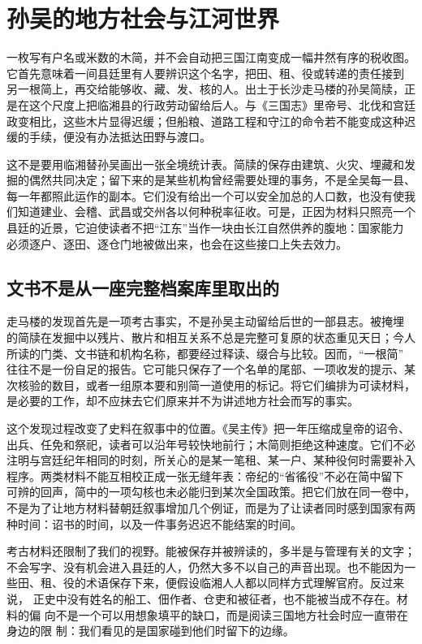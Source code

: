 \section{孙吴的地方社会与江河世界}
\label{reader:wu-river-society:start}

一枚写有户名或米数的木简，并不会自动把三国江南变成一幅井然有序的税收图。
它首先意味着一间县廷里有人要辨识这个名字，把田、租、役或转递的责任接到
另一根简上，再交给能够收、藏、发、核的人。出土于长沙走马楼的孙吴简牍，正
是在这个尺度上把临湘县的行政劳动留给后人。与《三国志》里帝号、北伐和宫廷
政变相比，这些木片显得迟缓；但船粮、道路工程和守江的命令若不能变成这种迟
缓的手续，便没有办法抵达田野与渡口。

这不是要用临湘替孙吴画出一张全境统计表。简牍的保存由建筑、火灾、埋藏和发
掘的偶然共同决定；留下来的是某些机构曾经需要处理的事务，不是全吴每一县、
每一年都照此运作的副本。它们没有给出一个可以安全加总的人口数，也没有使我
们知道建业、会稽、武昌或交州各以何种税率征收。可是，正因为材料只照亮一个
县廷的近景，它迫使读者不把“江东”当作一块由长江自然供养的腹地：国家能力
必须逐户、逐田、逐仓门地被做出来，也会在这些接口上失去效力。

\subsection{文书不是从一座完整档案库里取出的}

走马楼的发现首先是一项考古事实，不是孙吴主动留给后世的一部县志。被掩埋
的简牍在发掘中以残片、散片和相互关系不总是完整可复原的状态重见天日；今人
所读的门类、文书链和机构名称，都要经过释读、缀合与比较。因而，“一根简”
往往不是一份自足的报告。它可能只保存了一个名单的尾部、一项收发的提示、某
次核验的数目，或者一组原本要和别简一道使用的标记。将它们编排为可读材料，
是必要的工作，却不应抹去它们原来并不为讲述地方社会而写的事实。

这个发现过程改变了史料在叙事中的位置。《吴主传》把一年压缩成皇帝的诏令、
出兵、任免和祭祀，读者可以沿年号较快地前行；木简则拒绝这种速度。它们不必
注明与宫廷纪年相同的时刻，所关心的是某一笔租、某一户、某种役何时需要补入
程序。两类材料不能互相校正成一张无缝年表：帝纪的“省徭役”不必在简中留下
可辨的回声，简中的一项勾核也未必能归到某次全国政策。把它们放在同一卷中，
不是为了让地方材料替朝廷叙事增加几个例证，而是为了让读者同时感到国家有两
种时间：诏书的时间，以及一件事务迟迟不能结案的时间。

考古材料还限制了我们的视野。能被保存并被辨读的，多半是与管理有关的文字；
不会写字、没有机会进入县廷的人，仍然大多不以自己的声音出现。也不能因为一
些田、租、役的术语保存下来，便假设临湘人人都以同样方式理解官府。反过来说，
正史中没有姓名的船工、佃作者、仓吏和被征者，也不能被当成不存在。材料的偏
向不是一个可以用想象填平的缺口，而是阅读三国地方社会时应一直带在身边的限
制：我们看见的是国家碰到他们时留下的边缘。

